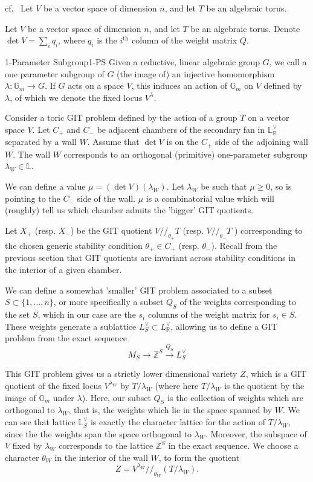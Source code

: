 cf.~\cite*{Kite_2022,ballard2014variation} Let $V$ be a vector space of dimension $n$, and let $T$ be an algebraic torus.

Let $V$ be a vector space of dimension $n$, and let $T$ be an algebraic torus. Denote $\det V = \sum_i q_i$, where $q_i$ is the $i^\mathrm{th}$ column of the weight matrix $Q$. 

\begin{definition}{1-Parameter Subgroup}{1-PS}
    Given a reductive, linear algebraic group $G$, we call a one parameter subgroup of $G$ (the image of) an injective homomorphism $\lambda : \mathbb{G}_{m}\to G$. If $G$ acts on a space $V$, this induces an action of $\mathbb{G}_m$ on $V$ defined by $\lambda$, of which we denote the fixed locus $V^\lambda$. 
\end{definition}

Consider a toric GIT problem defined by the action of a group $T$ on a vector space $V$. Let $C_+$ and $C_-$ be adjacent chambers of the secondary fan in $\mathbb{L}^{\vee}_\mathbb{R}$ separated by a wall $W$. Assume that $\det V$ is on the $C_{+}$ side of the adjoining wall $W$. The wall $W$ corresponds to an orthogonal (primitive) one-parameter subgroup $\lambda_{W}\in \mathbb{L}$.

We can define a value $\mu = (\det V)(\lambda_W)$. Let $\lambda_W$ be such that $\mu \geq 0$, so is pointing to the $C_-$ side of the wall. $\mu$ is a combinatorial value which will (roughly) tell us which chamber admits the 'bigger' GIT quotients. 

Let $X_+$ (resp. $X_-$) be the GIT quotient $V // _{\theta_{+}}T$ (resp. $V // _{\theta_{-}}T$ ) corresponding to the chosen generic stability condition $\theta_{+}\in C_+$ (resp. $\theta_-$).  Recall from the previous section that GIT quotients are invariant across stability conditions in the interior of a given chamber. 

We can define a somewhat 'smaller' GIT problem associated to a subset $S \subset \{ 1,\dots,n \}$, or more specifically a subset $Q_S$ of the weights corresponding to the set $S$, which in our case are the $s_i$ columns of the weight matrix for $s_{i}\in S$. These weights generate a sublattice $L_{S}^\vee\subset L_\mathbb{R}^\vee$, allowing us to define a GIT problem from the exact sequence $$M_{S}\to \mathbb{Z}^{S}\xrightarrow{Q_{S}}L_{S}^{\vee}$$

This GIT problem gives us a strictly lower dimensional variety $Z$, which is a GIT quotient of the fixed locus $V^{\lambda_{W}}$ by $T/\lambda_W$ (where here $T/ \lambda_W$ is the quotient by the image of $\mathbb{G}_m$ under $\lambda$). Here, our subset $Q_S$  is the collection of weights which are orthogonal to $\lambda_W$, that is, the weights which lie in the space spanned by $W$. We can see that lattice $\mathbb{L}_S^\vee$ is exactly the character lattice for the action of $T/\lambda_W$, since the the weights span the space orthogonal to $\lambda_W$. Moreover, the subspace of $V$ fixed by $\lambda_W$ corresponds to the lattice $\mathbb{Z}^S$ in the exact sequence. We choose a character $\theta_W$ in the interior of the wall $W$, to form the quotient $$Z = V^{\lambda_{W}} / /_{\theta_{W}} \left( T/ \lambda_{W}\right) . $$


